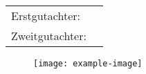 \begin{titlepage}
    \begin{center}
        \varAkademGrad \\
        \vspace{0.8cm}
        \Large{
        \textbf{\varTitel}
        }
        \\
        \vspace{0.6cm}
        \large{
        \textit{\varTitelEng}
        }
        \\
        \vspace{2.0cm}

        
        \Large{
        \textbf{\varAutorEins} \\
        }
        \large{
        \varOrt
        } 
       
        \vspace{0.5cm}
        
        
        \normalsize{
        \varDate \\
        \vspace{1.0cm}
        }       
        
        \normalsize
		\begin{table}[H]
			\centering
			\begin{tabular}{ll}
  			  Erstgutachter: & \varBetreuer \\ 
 		      Zweitgutachter: & \varZweitgutachter \\ 
			\end{tabular}
		\end{table} 

		\vspace{1.0cm}
        

        \begin{figure}[H]
			\centering
			\texttt{[image: example-image]}
		\end{figure}

        \textbf{\varFachbereich} \\
        \vspace{0.5cm}
        \textbf{\varInstitut}
        
    \end{center}
\end{titlepage}


